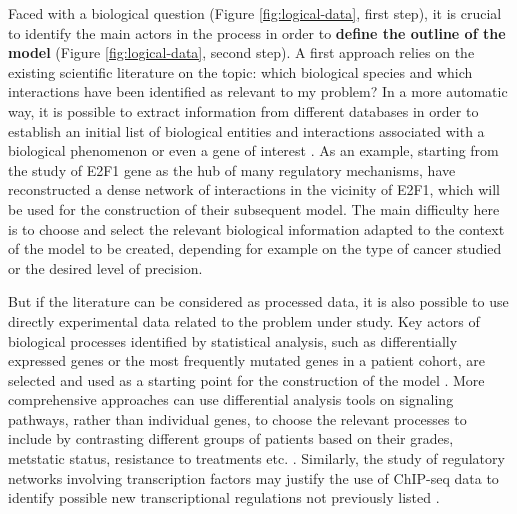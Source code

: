 \documentclass[a4paper,12pt,twoside,onecolumn,openright,final,oldfontcommands]{memoir}
\begin{document}
Faced with a biological question (Figure \ref{fig:logical-data}, first
step), it is crucial to identify the main actors in the process in order
to \textbf{define the outline of the model} (Figure
\ref{fig:logical-data}, second step). A first approach relies on the
existing scientific literature on the topic: which biological species
and which interactions have been identified as relevant to my problem?
In a more automatic way, it is possible to extract information from
different databases in order to establish an initial list of biological
entities and interactions associated with a biological phenomenon or
even a gene of interest \citep{kanehisa2012kegg, perfetto2016signor}. As
an example, starting from the study of E2F1 gene as the hub of many
regulatory mechanisms, \citet{khan2017unraveling} have reconstructed a
dense network of interactions in the vicinity of E2F1, which will be
used for the construction of their subsequent model. The main difficulty
here is to choose and select the relevant biological information adapted
to the context of the model to be created, depending for example on the
type of cancer studied or the desired level of precision.

But if the literature can be considered as processed data, it is also
possible to use directly experimental data related to the problem under
study. Key actors of biological processes identified by statistical
analysis, such as differentially expressed genes or the most frequently
mutated genes in a patient cohort, are selected and used as a starting
point for the construction of the model \citep{remy2015modeling}. More
comprehensive approaches can use differential analysis tools on
signaling pathways, rather than individual genes, to choose the relevant
processes to include by contrasting different groups of patients based
on their grades, metstatic status, resistance to treatments etc.
\citep{martignetti2016roma, montagud2017conceptual}. Similarly, the
study of regulatory networks involving transcription factors may justify
the use of ChIP-seq data to identify possible new transcriptional
regulations not previously listed \citep{collombet2017logical}.
\end{document}
